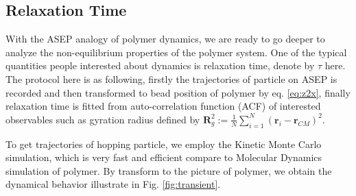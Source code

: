 \documentclass[aps,showpacs,twocolumn,floatfix,prx,superscriptaddress]{revtex4-1}
\begin{document}
\subsection{Relaxation Time}
With the ASEP analogy of polymer dynamics, we are ready to go deeper to analyze
the non-equilibrium properties of the polymer system. One of the typical
quantities people interested about dynamics is relaxation time, denote by
$\tau$ here. The protocol here is as following, firstly the trajectories of
particle on ASEP is recorded and then transformed to bead position of polymer
by eq.  \eqref{eq:z2x}, finally relaxation time is fitted from auto-correlation
function (ACF) of interested observables such as gyration radius defined
by $\mathbf{R}_g^2:= \frac{1}{N}\sum_{i=1}^N{\left(\mathbf{r}_i -
        \mathbf{r}_{CM}\right)^2}$.

To get trajectories of hopping particle, we employ the Kinetic Monte Carlo
simulation\cite{Gillespie1976}, which is very fast and efficient compare to Molecular Dynamics
simulation of polymer. By transform to the picture of polymer, we obtain the
dynamical behavior illustrate in Fig. \ref{fig:transient}. 
\end{document}
